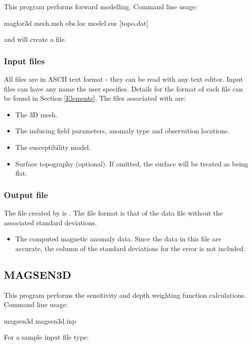 This program performs forward modelling. Command line usage:

\begin{fileExample}
magfor3d mesh.msh obs.loc model.sus [topo.dat]
\end{fileExample}
and will create a  file.

\subsubsection{Input files}
All files are in ASCII text format - they can be read with any text editor. Input files can have any name the user specifies. Details for the format of each file can be found in Section \ref{Elements}. The files associated with  are:
\begin{itemize}
\item[\fileName{mesh.msh}] The 3D mesh.
\item[\fileName{obs.loc}] The inducing field parameters, anomaly type and observation locations.
\item[\fileName{model.sus}] The susceptibility model.
\item[\fileName{topo.dat}] Surface topography (optional). If omitted, the surface will be treated as being flat.
\end{itemize}

\subsubsection{Output file}
The file created by  is . The file format is that of the data file without the associated standard deviations.
\begin{itemize}
\item[\fileName{magfor3d.mag}] The computed magnetic anomaly data. Since the data in this file are accurate, the column of the standard deviations for the error is not included.
\end{itemize}

\subsection{MAGSEN3D}
This program performs the sensitivity and depth weighting function calculations. Command line usage:
\begin{fileExample}
magsen3d magsen3d.inp
\end{fileExample}

For a sample input file type: 

